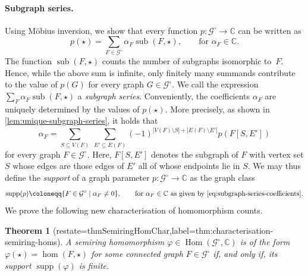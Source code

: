 \documentclass[11pt]{scrartcl}
\theoremstyle{definition}
\theoremstyle{plain}
\newtheorem{theorem}[definition]{Theorem}
\theoremstyle{remark}
\renewcommand\phi\varphi
\DeclareMathOperator\Hom{Hom}
\DeclareMathOperator{\supp}{supp}
\DeclareMathOperator{\sub}{sub}
\newcommand{\lG}{\mathcal{G}^\circ}
\newcommand{\C}{\mathbb{C}}
\begin{document}
	\paragraph{Subgraph series.}
	Using M\"obius inversion, we show that every function $p \colon \lG \to \mathbb{C}$ can be written as
	\[
		p(\star) = \sum_{F \in \lG} \alpha_F \sub(F, \star),
        \qquad 
        \text{for } \alpha_F \in \mathbb{C}.
	\]
	The function $\sub(F, \star)$ counts the number of subgraphs isomorphic to~$F$.
	Hence, while the above sum is infinite, only finitely many summands contribute to the value of $p(G)$ for every graph $G \in \lG$.
	We call the expression $\sum_{F} \alpha_F \sub(F, \star)$ a \emph{subgraph series}.
	Conveniently, the coefficients $\alpha_F$ are uniquely determined by the values of $p(\star)$.
	More precisely, as shown in \cref{lem:unique-subgraph-series}, it holds that
	\begin{equation}\label{eq:subgraph-series-coefficients}
		\alpha_F = \sum_{S \subseteq V(F)} \ \sum_{E' \subseteq E(F)} (-1)^{|V(F) \setminus S| + |E(F) \setminus E'|} p(F[S, E'])
	\end{equation}
	for every graph $F\in \lG$.
	Here, $F[S, E']$ denotes the subgraph of $F$ with vertex set $S$ whose edges are those edges of $E'$ all of whose endpoints lie in $S$.
	We may thus define the \emph{support} of a graph parameter $p \colon \lG \to \mathbb{C}$ as the graph class
	\[
		\supp(p) \coloneqq \{F \in \lG \mid \alpha_F \neq 0\},
        \qquad
        \text{for } \alpha_F \in \C \text{ as given by \cref{eq:subgraph-series-coefficients}.}
	\]
	We prove the following new characterisation of homomorphism counts.

	\begin{theorem}[restate=thmSemiringHomChar,label=thm:characterisation-semiring-homs]
		A semiring homomorphism $\phi \in \Hom(\lG, \mathbb{C})$ is of the form $\phi(\star) = \hom(F, \star)$ for some connected graph $F \in \lG$
		if, and only if, its support $\supp(\phi)$ is finite.
	\end{theorem}
\end{document}
